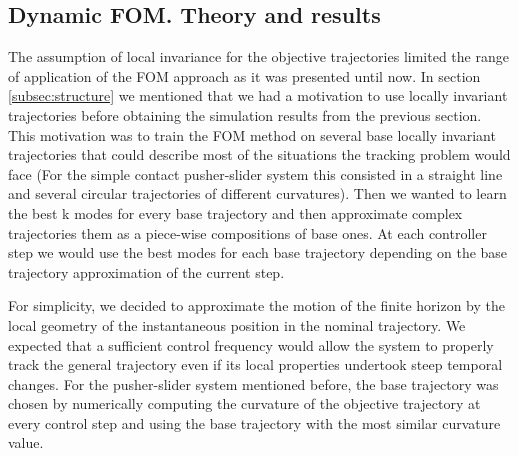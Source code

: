 \documentclass[12,twoside]{TFG-GM}
\theoremstyle{definition}
\theoremstyle{remark}
\begin{document}
\newpage

\subsection{Dynamic FOM. Theory and results}
\label{subsec:dynfom}
The assumption of local invariance for the objective trajectories limited the range of application of the FOM approach as it was presented until now. In section \ref{subsec:structure} we mentioned that we had a motivation to use locally invariant trajectories before obtaining the simulation results from the previous section. This motivation was to train the FOM method on several base locally invariant trajectories that could describe most of the situations the tracking problem would face (For the simple contact pusher-slider system this consisted in a straight line and several circular trajectories of different curvatures). Then we wanted to learn the best k modes for every base trajectory and then approximate complex trajectories them as a piece-wise compositions of base ones. At each controller step we would use the best modes for each base trajectory depending on the base trajectory approximation of the current step.

For simplicity, we decided to approximate the motion of the finite horizon by the local geometry of the instantaneous position in the nominal trajectory. We expected that a sufficient control frequency would allow the system to properly track the general trajectory even if its local properties undertook steep temporal changes. For the pusher-slider system mentioned before, the base trajectory was chosen by numerically computing the curvature of the objective trajectory at every control step and using the base trajectory with the most similar curvature value.
\end{document}
